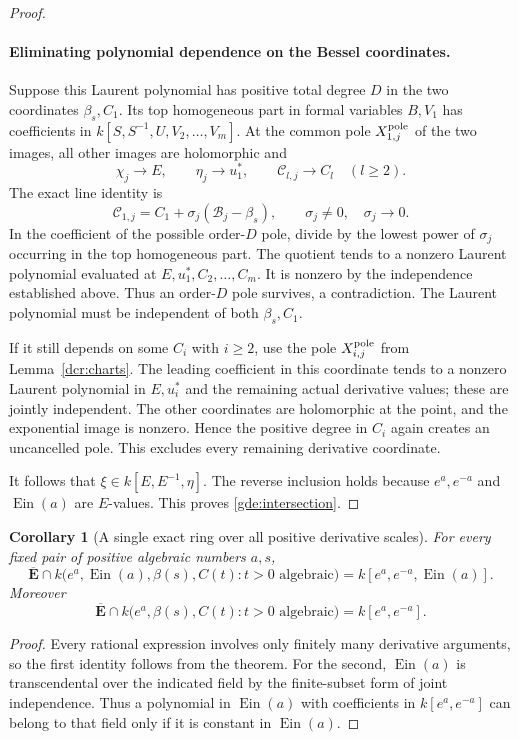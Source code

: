 \documentclass[11pt]{article}
\newtheorem{corollary}[theorem]{Corollary}
\theoremstyle{definition}
\theoremstyle{remark}
\newcommand{\Ein}{\operatorname{Ein}}
\begin{document}
\begin{proof}
\paragraph{Eliminating polynomial dependence on the Bessel coordinates.}
Suppose this Laurent polynomial has positive total degree $D$
in the two coordinates $\beta_s,C_1$.  Its top homogeneous part
in formal variables $B,V_1$ has coefficients in
$k[S,S^{-1},U,V_2,\ldots,V_m]$.
At the common pole $X_{1,j}^{\rm pole}$ of the two images,
all other images are holomorphic and
\[
 \chi_j\longrightarrow E,\qquad
 \eta_j\longrightarrow u_1^*,\qquad
 \mathscr C_{l,j}\longrightarrow C_l\quad(l\ge2).
\]
The exact line identity is
\[
 \mathscr C_{1,j}
   =C_1+\sigma_j(\mathscr B_j-\beta_s),
 \qquad \sigma_j\ne0,\quad \sigma_j\longrightarrow0.
\]
In the coefficient of the possible order-$D$ pole, divide by the
lowest power of $\sigma_j$ occurring in the top homogeneous part.
The quotient tends to a nonzero Laurent polynomial evaluated at
$E,u_1^*,C_2,\ldots,C_m$.  It is nonzero by the independence
established above.  Thus an order-$D$ pole survives, a contradiction.
The Laurent polynomial must be independent of both $\beta_s,C_1$.

If it still depends on some $C_i$ with $i\ge2$, use the pole
$X_{i,j}^{\rm pole}$ from Lemma~\ref{dcr:charts}.
The leading coefficient in this coordinate tends to a nonzero
Laurent polynomial in $E,u_i^*$ and the remaining actual derivative
values; these are jointly independent.  The other coordinates
are holomorphic at the point, and the exponential image is
nonzero.  Hence the positive degree in $C_i$ again creates an
uncancelled pole.  This excludes every remaining derivative
coordinate.

It follows that $\xi\in k[E,E^{-1},\eta]$.  The reverse inclusion
holds because $e^a,e^{-a}$ and $\Ein(a)$ are $E$-values.
This proves \eqref{gde:intersection}.
\end{proof}

\begin{corollary}[A single exact ring over all positive derivative scales]
\label{gde:global}
For every fixed pair of positive algebraic numbers $a,s$,
\[
 \overline{\mathbf E}\cap
 k\bigl(e^a,\Ein(a),\beta(s),C(t):
                 t>0\text{ algebraic}\bigr)
       =k[e^a,e^{-a},\Ein(a)].
\]
Moreover
\[
 \overline{\mathbf E}\cap
 k\bigl(e^a,\beta(s),C(t):t>0\text{ algebraic}\bigr)
       =k[e^a,e^{-a}].
\]
\end{corollary}
\begin{proof}
Every rational expression involves only finitely many derivative
arguments, so the first identity follows from the theorem.
For the second, $\Ein(a)$ is transcendental over the indicated
field by the finite-subset form of joint independence.
Thus a polynomial in $\Ein(a)$ with coefficients in
$k[e^a,e^{-a}]$ can belong to that field only if it is constant
in $\Ein(a)$.
\end{proof}
\end{document}
